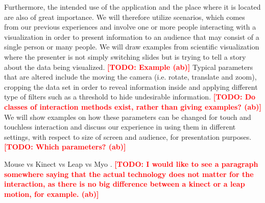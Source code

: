 \documentclass[review,journal]{vgtc}         %
\newcommand{\todo}[1]{\textbf{\textcolor{red}{[TODO: {#1}]}}}
\begin{document}
Furthermore, the intended use of the application and the place where it is located are also of great importance. 
We will therefore utilize scenarios, which comes from our previous experiences and involve one or more people interacting with a visualization in order to present information to an audience that may consist of a single person or many people.  
We will draw examples from scientific visualization where the presenter is not simply switching slides but is trying to tell a story about the data being visualized. \todo{Example (ab)}
Typical parameters that are altered include the moving the camera (i.e. rotate, translate and zoom), cropping the data set in order to reveal information inside and applying different type of filters such as a threshold to hide undesirable information. \todo{Do classes of interaction methods exist, rather than giving examples? (ab)}
We will show examples on how these parameters can be changed for touch and touchless interaction and discuss our experience in using them in different settings, with respect to size of screen and audience, for presentation purposes. \todo{Which parameters? (ab)}
%

%
%

Mouse vs Kinect vs Leap vs Myo \cite{doi:10.1117/12.2006994}. \todo{I would like to see a paragraph somewhere saying that the actual technology does not matter for the interaction, as there is no big difference between a kinect or a leap motion, for example. (ab)}
\end{document}

